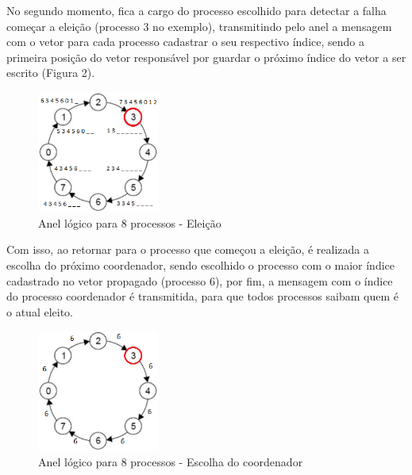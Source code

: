 \documentclass{article}
\begin{document}
\begin{multicols*}{2}
No segundo momento, fica a cargo do processo escolhido para detectar a falha começar a eleição (processo 3 no exemplo), transmitindo pelo anel a mensagem com o vetor para cada processo cadastrar o seu respectivo índice, sendo a primeira posição do vetor responsável por guardar o próximo índice do vetor a ser escrito (Figura 2).

\begin{figure}[H]
            \centering
            \vspace{-0.3em}
            \includegraphics[width=4cm, height=4cm]{anel_eleicao2.png}
            \vspace{-0.6em}
            \caption{Anel lógico para 8 processos - Eleição}
            \vspace{-1.1em}
\end{figure}

Com isso, ao retornar para o processo que começou a eleição, é realizada a escolha do próximo coordenador,  sendo escolhido o processo com o maior índice cadastrado no vetor propagado (processo 6), por fim, a mensagem com o índice do processo coordenador é transmitida, para que todos processos saibam quem é o atual eleito.

\begin{figure}[H]
            \centering
            \vspace{-0.3em}
            \includegraphics[width=4cm, height=4cm]{anel_coordenador.png}
            \vspace{-0.6em}
            \caption{Anel lógico para 8 processos - Escolha do coordenador}
            \vspace{-1.1em}
\end{figure}


\end{multicols*}
\end{document}
